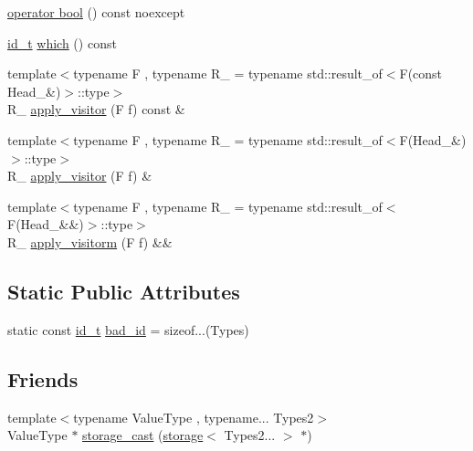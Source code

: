 \begin{DoxyCompactItemize}
\item 
\hyperlink{structmui_1_1storage_a8c4b21ae13ecbcb7fe8977a20a4d5a14}{operator bool} () const noexcept
\item 
\hyperlink{structmui_1_1storage_a1e1d8c3e802463d4b0e3804865e365de}{id\+\_\+t} \hyperlink{structmui_1_1storage_aa7ed6b7701e979a4efc28714496cb974}{which} () const
\item 
{\footnotesize template$<$typename F , typename R\+\_\+  = typename std\+::result\+\_\+of$<$\+F(const Head\+\_\+\&)$>$\+::type$>$ }\\R\+\_\+ \hyperlink{structmui_1_1storage_ad3bdb6ae63b978606e05cd0541bfa102}{apply\+\_\+visitor} (F f) const \&
\item 
{\footnotesize template$<$typename F , typename R\+\_\+  = typename std\+::result\+\_\+of$<$\+F(\+Head\+\_\+\&)$>$\+::type$>$ }\\R\+\_\+ \hyperlink{structmui_1_1storage_a3efda26f5657d61c19416569661c3898}{apply\+\_\+visitor} (F f) \&
\item 
{\footnotesize template$<$typename F , typename R\+\_\+  = typename std\+::result\+\_\+of$<$\+F(\+Head\+\_\+\&\&)$>$\+::type$>$ }\\R\+\_\+ \hyperlink{structmui_1_1storage_ad1a6366fdb20d61f0bc2ac2fd8b6323b}{apply\+\_\+visitorm} (F f) \&\&
\end{DoxyCompactItemize}
\subsection*{Static Public Attributes}
\begin{DoxyCompactItemize}
\item 
static const \hyperlink{structmui_1_1storage_a1e1d8c3e802463d4b0e3804865e365de}{id\+\_\+t} \hyperlink{structmui_1_1storage_a6df80233e8d59cdb4c3bf93f6499d0db}{bad\+\_\+id} = sizeof...(Types)
\end{DoxyCompactItemize}
\subsection*{Friends}
\begin{DoxyCompactItemize}
\item 
{\footnotesize template$<$typename Value\+Type , typename... Types2$>$ }\\Value\+Type $\ast$ \hyperlink{structmui_1_1storage_a08bdd07212e812605f031d71cde701b1}{storage\+\_\+cast} (\hyperlink{structmui_1_1storage}{storage}$<$ Types2... $>$ $\ast$)
\end{DoxyCompactItemize}


